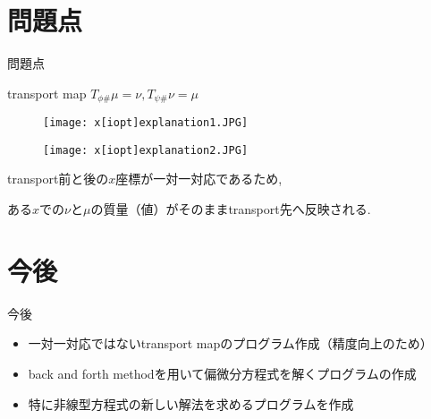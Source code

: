 \documentclass[aspectratio=169, dvipdfmx, 12pt]{beamer}
\begin{document}
\section{問題点}
\begin{frame}{問題点}

    \begin{block}{transport map}
        $T_{\phi \#} \mu = \nu, T_{\psi \#} \nu = \mu$
    \end{block}

    \begin{figure}[htb]
        \begin{center}
            \begin{minipage}{0.40\hsize}
                \texttt{[image: x[iopt]explanation1.JPG]}
            \end{minipage}
            \begin{minipage}{0.40\hsize}
                \texttt{[image: x[iopt]explanation2.JPG]}
            \end{minipage}
        \end{center}
    \end{figure}
    \label{x[iopt]explanation}

    transport前と後の$x$座標が一対一対応であるため,

    ある$x$での$\nu$と$\mu$の質量（値）がそのままtransport先へ反映される.

\end{frame}

\section{今後}
\begin{frame}{今後}
    \begin{itemize}
        \item 一対一対応ではないtransport mapのプログラム作成（精度向上のため）
        \item back and forth methodを用いて偏微分方程式を解くプログラムの作成
        \item 特に非線型方程式の新しい解法を求めるプログラムを作成
    \end{itemize}

\end{frame}
\end{document}
